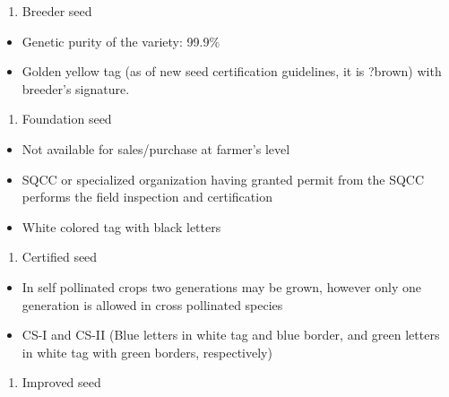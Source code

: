 \documentclass[
  openany]{book}
\providecommand{\tightlist}{%
  \setlength{\itemsep}{0pt}\setlength{\parskip}{0pt}}
\begin{document}
\begin{enumerate}
\def\labelenumi{\arabic{enumi}.}
\tightlist
\item
  Breeder seed
\end{enumerate}

\begin{itemize}
\tightlist
\item
  Genetic purity of the variety: 99.9\%
\item
  Golden yellow tag (as of new seed certification guidelines, it is ?brown) with breeder's signature.
\end{itemize}

\begin{enumerate}
\def\labelenumi{\arabic{enumi}.}
\setcounter{enumi}{1}
\tightlist
\item
  Foundation seed
\end{enumerate}

\begin{itemize}
\tightlist
\item
  Not available for sales/purchase at farmer's level
\item
  SQCC or specialized organization having granted permit from the SQCC performs the field inspection and certification
\item
  White colored tag with black letters
\end{itemize}

\begin{enumerate}
\def\labelenumi{\arabic{enumi}.}
\setcounter{enumi}{1}
\tightlist
\item
  Certified seed
\end{enumerate}

\begin{itemize}
\tightlist
\item
  In self pollinated crops two generations may be grown, however only one generation is allowed in cross pollinated species
\item
  CS-I and CS-II (Blue letters in white tag and blue border, and green letters in white tag with green borders, respectively)
\end{itemize}

\begin{enumerate}
\def\labelenumi{\arabic{enumi}.}
\setcounter{enumi}{2}
\tightlist
\item
  Improved seed
\end{enumerate}
\end{document}
